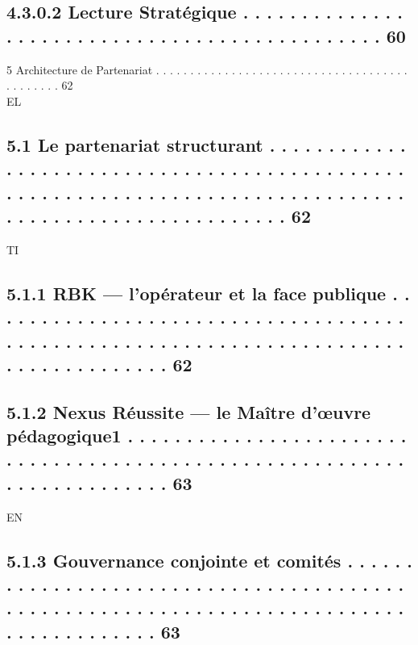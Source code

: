 \documentclass[12pt,landscape,a4paper]{article}
\begin{document}
\subsection{4.3.0.2           Lecture Stratégique . . . . . . . . . . . . . . . . . . . . . . . . . . . . . . . . . . . . . . . . . . . . . .                                                                                                        60}
5       Architecture de Partenariat . . . . . . . . . . . . . . . . . . . . . . . . . . . . . . . . . . . . . . . . . . . . . 62\\
\vspace{0.5em}
\vspace{0.5em}
\vspace{0.5em}
\vspace{0.5em}
EL\\
\subsection{5.1     Le partenariat structurant . . . . . . . . . . . . . . . . . . . . . . . . . . . . . . . . . . . . . . . . . . . . . . . . . . . . . . . . . . . . . . . . . . . . . . . . . . . . . . . . . . . . . . . . . . . . . . . . . . . . . . . . 62}
\vspace{0.5em}
\vspace{0.5em}
\vspace{0.5em}
\vspace{0.5em}
TI\\
\subsection{5.1.1              RBK — l’opérateur et la face publique . . . . . . . . . . . . . . . . . . . . . . . . . . . . . . . . . . . . . . . . . . . . . . . . . . . . . . . . . . . . . . . . . . . . . . . . . . . . . . . . . . . . 62}
\subsection{5.1.2              Nexus Réussite — le Maître d’œuvre pédagogique1 . . . . . . . . . . . . . . . . . . . . . . . . . . . . . . . . . . . . . . . . . . . . . . . . . . . . . . . . . . . . . . . . . . . . . . . . 63}
\vspace{0.5em}
\vspace{0.5em}
\vspace{0.5em}
\vspace{0.5em}
EN\\
\subsection{5.1.3              Gouvernance conjointe et comités . . . . . . . . . . . . . . . . . . . . . . . . . . . . . . . . . . . . . . . . . . . . . . . . . . . . . . . . . . . . . . . . . . . . . . . . . . . . . . . . . . . . . . . 63}
\end{document}
